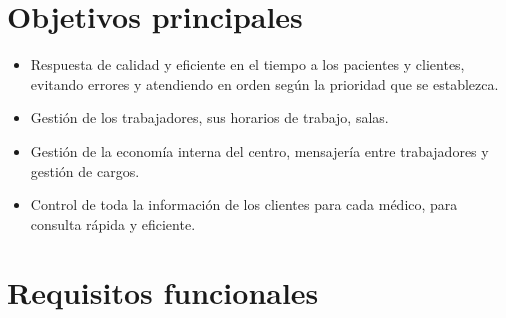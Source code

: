 \documentclass[11pt]{article}
\begin{document}
\section{Objetivos principales}
\label{sec:orge584ad9}
\begin{itemize}
\item Respuesta de calidad y eficiente en el tiempo a los pacientes y clientes, evitando errores y atendiendo en orden según la prioridad que se establezca.
\item Gestión de los trabajadores, sus horarios de trabajo, salas.
\item Gestión de la economía interna del centro, mensajería entre trabajadores y gestión de cargos.
\item Control de toda la información de los clientes para cada médico, para consulta rápida y eficiente.
\end{itemize}

\section{Requisitos funcionales}
\label{sec:org297742e}
\end{document}
